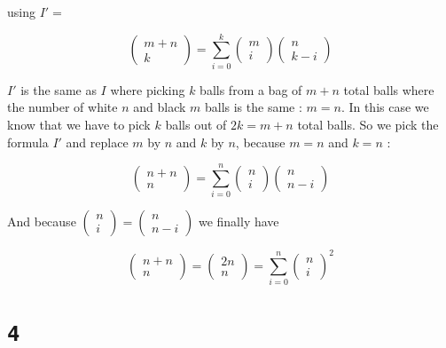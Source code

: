 \documentclass[a4paper,11pt]{report}
\begin{document}
using $I' = $

$$
\begin{pmatrix} m + n \\ k\end{pmatrix} = \sum_{i=0}^{k}\begin{pmatrix} m \\
  i\end{pmatrix} \begin{pmatrix} n \\ k-i\end{pmatrix}
$$

$I'$ is the same as $I$ where picking $k$ balls from a bag of $m + n$ total balls
where the number of white $n$ and black $m$ balls is the same : $m = n$. In this
case we know that we have to pick $k$ balls out of $2k = m + n$ total balls. So
we pick the formula $I'$ and replace $m$ by $n$ and $k$ by $n$, because $m = n$
and $k = n$ :

$$
\begin{pmatrix} n + n \\ n\end{pmatrix} = \sum_{i=0}^{n}\begin{pmatrix} n \\
  i\end{pmatrix} \begin{pmatrix} n \\ n-i\end{pmatrix}
$$

And because $\begin{pmatrix} n \\ i\end{pmatrix} = \begin{pmatrix} n \\
  n-i\end{pmatrix}$ we finally have

$$
\begin{pmatrix} n + n \\ n\end{pmatrix} = \begin{pmatrix} 2n \\ n\end{pmatrix} = \sum_{i=0}^{n}\begin{pmatrix} n \\
  i\end{pmatrix}^2
$$

\section*{\texttt{4}}
\end{document}
